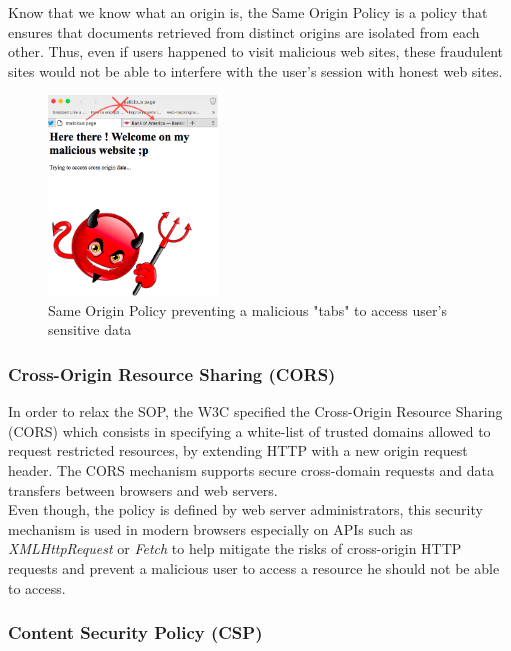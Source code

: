 \documentclass[journal]{IEEEtran}
\begin{document}
\medskip

Know that we know what an origin is, the Same Origin Policy is a policy that ensures that documents retrieved from distinct origins are isolated from each other. Thus, even if users happened to visit malicious web sites, these fraudulent sites would not be able to interfere with the user's session with honest web sites.

\begin{figure}[h]
\centering
\includegraphics[width=0.4\textwidth]{images/SOPTabs.png}
\caption{Same Origin Policy preventing a malicious "tabs" to access user's sensitive data}
\label{fig:SOPTabs}
\end{figure}

\subsubsection{Cross-Origin Resource Sharing (CORS)}

In order to relax the SOP, the W3C specified the Cross-Origin Resource Sharing (CORS) which consists in specifying a white-list of trusted domains allowed to request restricted resources, by extending HTTP with a new origin request header. The CORS mechanism supports secure cross-domain requests and data transfers between browsers and web servers. \\

Even though, the policy is defined by web server administrators, this security mechanism is used in modern browsers especially on APIs such as \emph{XMLHttpRequest} or \emph{Fetch} to help mitigate the risks of cross-origin HTTP requests and prevent a malicious user to access a resource he should not be able to access.

\subsubsection{Content Security Policy (CSP)}
\end{document}
